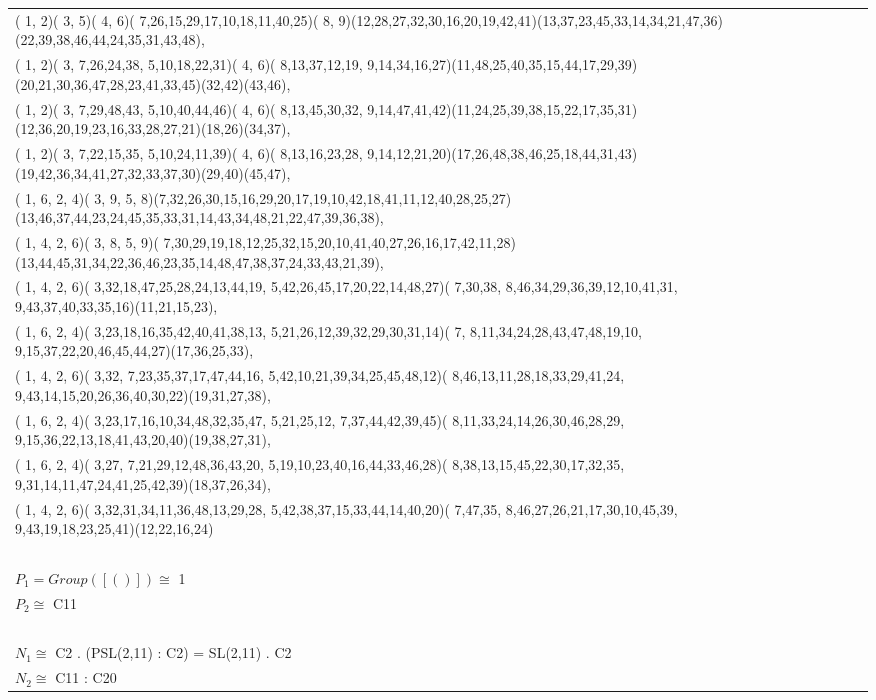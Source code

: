 \documentclass[border=10]{standalone}
\begin{document}
\begin{tabular}{@{}l@{}l@{}l@{}l@{}l@{}l@{}l@{}l@{}}
( 1, 2)( 3, 5)( 4, 6)( 7,26,15,29,17,10,18,11,40,25)( 8, 9)(12,28,27,32,30,16,20,19,42,41)(13,37,23,45,33,14,34,21,47,36)(22,39,38,46,44,24,35,31,43,48), \ \\
( 1, 2)( 3, 7,26,24,38, 5,10,18,22,31)( 4, 6)( 8,13,37,12,19, 9,14,34,16,27)(11,48,25,40,35,15,44,17,29,39)(20,21,30,36,47,28,23,41,33,45)(32,42)(43,46), \ \\
( 1, 2)( 3, 7,29,48,43, 5,10,40,44,46)( 4, 6)( 8,13,45,30,32, 9,14,47,41,42)(11,24,25,39,38,15,22,17,35,31)(12,36,20,19,23,16,33,28,27,21)(18,26)(34,37), \ \\
( 1, 2)( 3, 7,22,15,35, 5,10,24,11,39)( 4, 6)( 8,13,16,23,28, 9,14,12,21,20)(17,26,48,38,46,25,18,44,31,43)(19,42,36,34,41,27,32,33,37,30)(29,40)(45,47), \ \\
( 1, 6, 2, 4)( 3, 9, 5, 8)(7,32,26,30,15,16,29,20,17,19,10,42,18,41,11,12,40,28,25,27)(13,46,37,44,23,24,45,35,33,31,14,43,34,48,21,22,47,39,36,38), \ \\
( 1, 4, 2, 6)( 3, 8, 5, 9)( 7,30,29,19,18,12,25,32,15,20,10,41,40,27,26,16,17,42,11,28)(13,44,45,31,34,22,36,46,23,35,14,48,47,38,37,24,33,43,21,39), \ \\
( 1, 4, 2, 6)( 3,32,18,47,25,28,24,13,44,19, 5,42,26,45,17,20,22,14,48,27)( 7,30,38, 8,46,34,29,36,39,12,10,41,31, 9,43,37,40,33,35,16)(11,21,15,23), \ \\
( 1, 6, 2, 4)( 3,23,18,16,35,42,40,41,38,13, 5,21,26,12,39,32,29,30,31,14)( 7, 8,11,34,24,28,43,47,48,19,10, 9,15,37,22,20,46,45,44,27)(17,36,25,33), \ \\
( 1, 4, 2, 6)( 3,32, 7,23,35,37,17,47,44,16, 5,42,10,21,39,34,25,45,48,12)( 8,46,13,11,28,18,33,29,41,24, 9,43,14,15,20,26,36,40,30,22)(19,31,27,38), \ \\
( 1, 6, 2, 4)( 3,23,17,16,10,34,48,32,35,47, 5,21,25,12, 7,37,44,42,39,45)( 8,11,33,24,14,26,30,46,28,29, 9,15,36,22,13,18,41,43,20,40)(19,38,27,31), \ \\
( 1, 6, 2, 4)( 3,27, 7,21,29,12,48,36,43,20, 5,19,10,23,40,16,44,33,46,28)( 8,38,13,15,45,22,30,17,32,35, 9,31,14,11,47,24,41,25,42,39)(18,37,26,34), \ \\
( 1, 4, 2, 6)( 3,32,31,34,11,36,48,13,29,28, 5,42,38,37,15,33,44,14,40,20)( 7,47,35, 8,46,27,26,21,17,30,10,45,39, 9,43,19,18,23,25,41)(12,22,16,24)\ \\ \ \\

$P_1 = Group( [ () ] )\cong$ 1\ \\
$P_2 \cong$ C11\ \\
\ \\
$N_1 \cong$ C2 . (PSL(2,11) : C2) = SL(2,11) . C2\ \\
$N_2 \cong$ C11 : C20\end{tabular}
\end{document}
